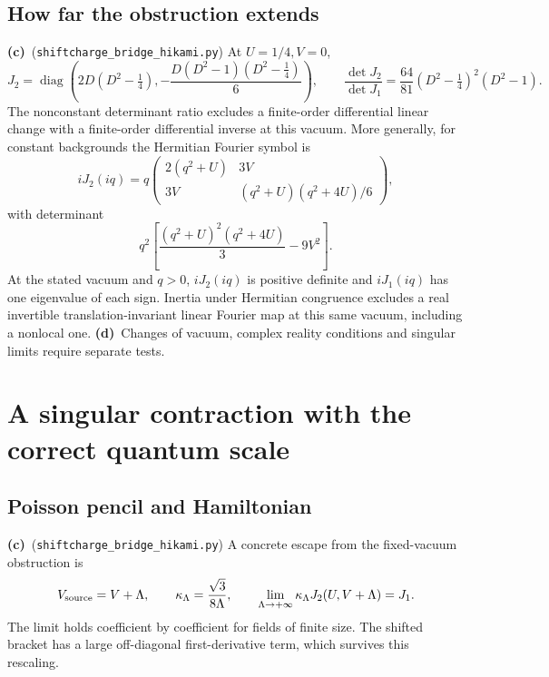 \documentclass[11pt,a4paper]{article}
\newcommand{\C}{\textbf{(c)}\ }
\newcommand{\D}{\textbf{(d)}\ }
\newcommand{\file}[1]{\nolinkurl{#1}}
\newcommand{\hk}{\file{shiftcharge_bridge_hikami.py}}
\begin{document}
\subsection{How far the obstruction extends}
\C (\hk) At $U=1/4,V=0$,
\begin{equation}
 J_2=\operatorname{diag}\left(
 2D(D^2-\tfrac14),-\frac{D(D^2-1)(D^2-\tfrac14)}6\right),
 \qquad
 \frac{\det J_2}{\det J_1}
 =\frac{64}{81}(D^2-\tfrac14)^2(D^2-1).
 \label{det-ratio}
\end{equation}
The nonconstant determinant ratio excludes a finite-order differential
linear change with a finite-order differential inverse at this vacuum.
More generally, for constant backgrounds the Hermitian Fourier symbol is
\begin{equation}
 iJ_2(iq)=q
 \begin{pmatrix}
 2(q^2+U)&3V\\
 3V&(q^2+U)(q^2+4U)/6
 \end{pmatrix},
 \label{symbol}
\end{equation}
with determinant
\begin{equation}
 q^2\left[\frac{(q^2+U)^2(q^2+4U)}3-9V^2\right].
 \label{symbol-det}
\end{equation}
At the stated vacuum and $q>0$, $iJ_2(iq)$ is positive definite and
$iJ_1(iq)$ has one eigenvalue of each sign. Inertia under Hermitian congruence
excludes a real invertible translation-invariant linear Fourier map at this
same vacuum, including a nonlocal one.
\D Changes of vacuum, complex reality conditions and singular limits
require separate tests.

\section{A singular contraction with the correct quantum scale}
\subsection{Poisson pencil and Hamiltonian}
\C (\hk) A concrete escape from the fixed-vacuum obstruction is
\begin{equation}
 V_{\rm source}=V+\Lambda,\qquad
 \kappa_\Lambda=\frac{\sqrt3}{8\Lambda},\qquad
 \lim_{\Lambda\to+\infty}\kappa_\Lambda J_2(U,V+\Lambda)=J_1 .
 \label{contraction}
\end{equation}
The limit holds coefficient by coefficient for fields of finite size.
The shifted bracket has a large off-diagonal first-derivative term,
which survives this rescaling.
\end{document}
